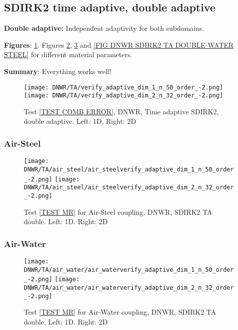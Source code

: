 \documentclass[a4paper,10pt]{article}
\begin{document}
\FloatBarrier
\subsection{SDIRK2 time adaptive, double adaptive}\label{SEC DNWR SDIRK2 TA DOUBLE}
% 
\textbf{Double adaptive:} Independent adaptivity for both subdomains.

\textbf{Figures}: \ref{FIG DNWR SDIRK2 TA DOUBLE ERROR}. Figures \ref{FIG DNWR SDIRK2 TA DOUBLE AIR STEEL}, \ref{FIG DNWR SDIRK2 TA DOUBLE AIR WATER} and \ref{FIG DNWR SDIRK2 TA DOUBLE WATER STEEL} for different material parameters.

\textbf{Summary}: Everything works well! 

\begin{figure}[!ht]
\texttt{[image: DNWR/TA/verify\_adaptive\_dim\_1\_n\_50\_order\_-2.png]}
\texttt{[image: DNWR/TA/verify\_adaptive\_dim\_2\_n\_32\_order\_-2.png]}
\caption{Test \ref{TEST COMB ERROR}, DNWR, Time adaptive SDIRK2, double adaptive. Left: 1D, Right: 2D}
\label{FIG DNWR SDIRK2 TA DOUBLE ERROR}
\end{figure}

\FloatBarrier
\subsubsection{Air-Steel}\label{SEC DNWR TA DOUBLE AIR STEEL}
% 

\begin{figure}[!ht]
\texttt{[image: DNWR/TA/air\_steel/air\_steelverify\_adaptive\_dim\_1\_n\_50\_order\_-2.png]}
\texttt{[image: DNWR/TA/air\_steel/air\_steelverify\_adaptive\_dim\_2\_n\_32\_order\_-2.png]}
\caption{Test \ref{TEST MR} for Air-Steel coupling, DNWR, SDIRK2 TA double. Left: 1D. Right: 2D}
\label{FIG DNWR SDIRK2 TA DOUBLE AIR STEEL}
\end{figure}

\FloatBarrier
\subsubsection{Air-Water}\label{SEC DNWR TA DOUBLE AIR WATER}
% 

\begin{figure}[!ht]
\texttt{[image: DNWR/TA/air\_water/air\_waterverify\_adaptive\_dim\_1\_n\_50\_order\_-2.png]}
\texttt{[image: DNWR/TA/air\_water/air\_waterverify\_adaptive\_dim\_2\_n\_32\_order\_-2.png]}
\caption{Test \ref{TEST MR} for Air-Water coupling, DNWR, SDIRK2 TA double. Left: 1D. Right: 2D}
\label{FIG DNWR SDIRK2 TA DOUBLE AIR WATER}
\end{figure}
\end{document}
